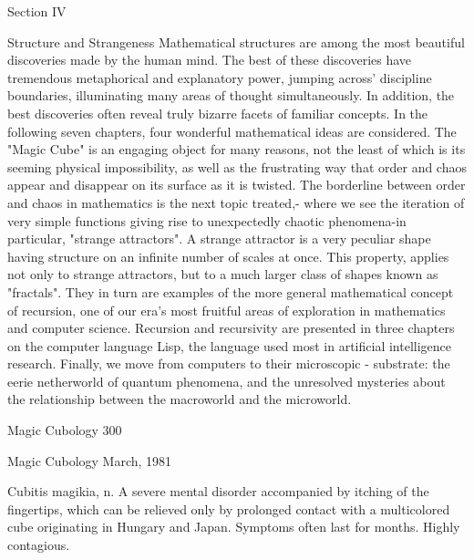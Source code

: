 
                                                                         Section IV

                                            Structure and Strangeness
        Mathematical structures are among the most beautiful discoveries made by the
human mind. The best of these discoveries have tremendous metaphorical and
explanatory power, jumping across' discipline boundaries, illuminating many areas of
thought simultaneously. In addition, the best discoveries often reveal truly bizarre
facets of familiar concepts. In the following seven chapters, four wonderful
mathematical ideas are considered. The "Magic Cube" is an engaging object for many
reasons, not the least of which is its seeming physical impossibility, as well as the
frustrating way that order and chaos appear and disappear on its surface as it is
twisted. The borderline between order and chaos in mathematics is the next topic
treated,- where we see the iteration of very simple functions giving rise to
unexpectedly chaotic phenomena-in particular, "strange attractors". A strange
attractor is a very peculiar shape having structure on an infinite number of scales at
once. This property, applies not only to strange attractors, but to a much larger class
of shapes known as "fractals". They in turn are examples of the more general
mathematical concept of recursion, one of our era's most fruitful areas of exploration
in mathematics and computer science. Recursion and recursivity are presented in three
chapters on the computer language Lisp, the language used most in artificial
intelligence research. Finally, we move from computers to their microscopic -
substrate: the eerie netherworld of quantum phenomena, and the unresolved mysteries
about the relationship between the macroworld and the microworld.




Magic Cubology                                                                     300


                                Magic Cubology
                                     March, 1981

                                                Cubitis magikia, n. A severe mental
                                                disorder accompanied by itching of the
                                                fingertips, which can be relieved only
                                                by prolonged contact with a
                                                multicolored cube originating in
                                                Hungary and Japan. Symptoms often
                                                last for months. Highly contagious.


